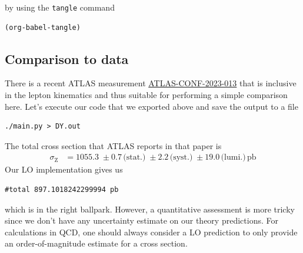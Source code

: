 \documentclass[11pt]{article}
\begin{document}
by using the \texttt{tangle} command
\begin{verbatim}
(org-babel-tangle)
\end{verbatim}
\subsection{Comparison to data}
\label{sec:org7d71f5b}
There is a recent ATLAS measurement \href{https://atlas.web.cern.ch/Atlas/GROUPS/PHYSICS/CONFNOTES/ATLAS-CONF-2023-013/}{ATLAS-CONF-2023-013} that is inclusive in the lepton kinematics and thus suitable for performing a simple comparison here.
Let's execute our code that we exported above and save the output to a file
\begin{verbatim}
./main.py > DY.out
\end{verbatim}
The total cross section that ATLAS reports in that paper is
\begin{align}
  \sigma_\mathrm{Z}
  &=
  1055.3 \;\pm 0.7 \,\text{(stat.)} \;\pm 2.2 \,\text{(syst.)} \;\pm 19.0 \,\text{(lumi.)} \,\mathrm{pb}
\end{align}
Our LO implementation gives us
\label{}
\begin{verbatim}
#total 897.1018242299994 pb
\end{verbatim}

which is in the right ballpark.
However, a quantitative assessment is more tricky since we don't have any uncertainty estimate on our theory predictions.
For calculations in QCD, one should always consider a LO prediction to only provide an order-of-magnitude estimate for a cross section.
\end{document}
